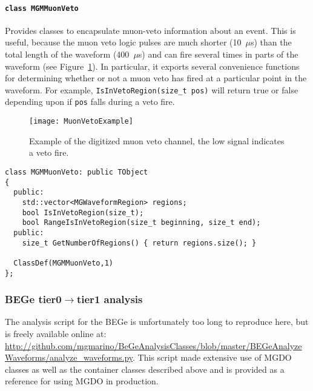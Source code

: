 				\paragraph{\lstinline!class MGMMuonVeto!}
Provides classes to encapsulate muon-veto information about an event.  This is useful, because the muon veto logic pulses are much shorter (10~$\mu$s) than the total length of the waveform (400~$\mu$s) and can fire several times in parts of the waveform (see Figure~\ref{fig:MuonVetoExample}).  In particular, it exports several convenience functions
for determining whether or not a muon veto has fired at a particular point in the waveform.  For example, \lstinline!IsInVetoRegion(size_t pos)! will return true or false depending upon if \lstinline!pos! falls during a veto fire.
					\begin{figure}
						\centering
						\texttt{[image: MuonVetoExample]}
						\caption[Example of the digitized muon veto channel.]
						{Example of the digitized muon veto channel, the low signal indicates a veto fire.}
						\label{fig:MuonVetoExample}
					\end{figure}
					\begin{lstlisting}
class MGMMuonVeto: public TObject
{
  public:
    std::vector<MGWaveformRegion> regions;
    bool IsInVetoRegion(size_t);
    bool RangeIsInVetoRegion(size_t beginning, size_t end);
  public:
    size_t GetNumberOfRegions() { return regions.size(); }
    
  ClassDef(MGMMuonVeto,1)
};
					\end{lstlisting}		
			\subsubsection{BEGe tier0\texorpdfstring{$\to$}{ to }tier1 analysis}	
The analysis script for the BEGe is unfortunately too long to reproduce here, but is freely available online at:
\url{http://github.com/mgmarino/BeGeAnalysisClasses/blob/master/BEGeAnalyzeWaveforms/analyze_waveforms.py}.  This 
script made extensive use of MGDO classes as well as the container classes described above and is provided as a reference
for using MGDO in production.
					
